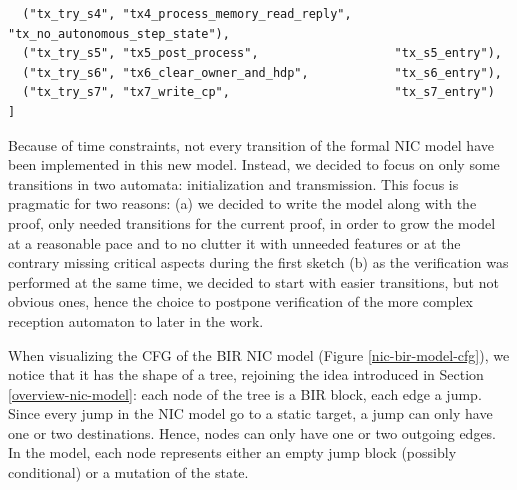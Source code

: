 \documentclass{kththesis}
\begin{document}
{\begin{lstlisting}
  ("tx_try_s4", "tx4_process_memory_read_reply",      "tx_no_autonomous_step_state"),
  ("tx_try_s5", "tx5_post_process",                   "tx_s5_entry"),
  ("tx_try_s6", "tx6_clear_owner_and_hdp",            "tx_s6_entry"),
  ("tx_try_s7", "tx7_write_cp",                       "tx_s7_entry")
]
\end{lstlisting}
%
Because of time constraints, not every transition of the formal NIC model have been implemented in this new model. Instead, we decided to focus on only some transitions in two automata: initialization and transmission. This focus is pragmatic for two reasons: (a) we decided to write the model along with the proof, only needed transitions for the current proof, in order to grow the model at a reasonable pace and to no clutter it with unneeded features or at the contrary missing critical aspects during the first sketch (b) as the verification was performed at the same time, we decided to start with easier transitions, but not obvious ones, hence the choice to postpone verification of the more complex reception automaton to later in the work.

When visualizing the \gls{CFG} of the BIR NIC model (Figure \ref{nic-bir-model-cfg}), we notice that it has the shape of a tree, rejoining the idea introduced in Section \ref{overview-nic-model}: each node of the tree is a BIR block, each edge a jump. Since every jump in the NIC model go to a static target, a jump can only have one or two destinations. Hence, nodes can only have one or two outgoing edges. In the model, each node represents either an empty jump block (possibly conditional) or a mutation of the state.

}
\end{document}
